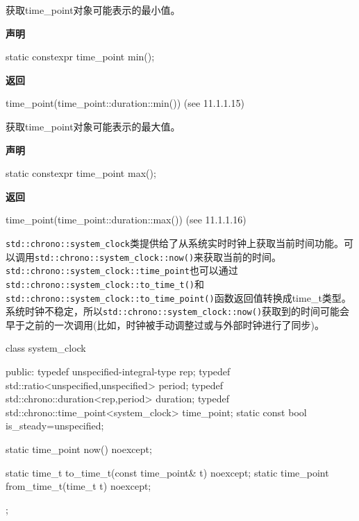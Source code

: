 获取time\_point对象可能表示的最小值。

\textbf{声明}

\begin{cpp}
static constexpr time_point min();
\end{cpp}

\textbf{返回}

\begin{cpp}
time_point(time_point::duration::min()) (see 11.1.1.15)
\end{cpp}


获取time\_point对象可能表示的最大值。

\textbf{声明}

\begin{cpp}
static constexpr time_point max();
\end{cpp}

\textbf{返回}

\begin{cpp}
time_point(time_point::duration::max()) (see 11.1.1.16)
\end{cpp}


\texttt{std::chrono::system\_clock}类提供给了从系统实时时钟上获取当前时间功能。可以调用\texttt{std::chrono::system\_clock::now()}来获取当前的时间。\texttt{std::chrono::system\_clock::time\_point}也可以通过\texttt{std::chrono::system\_clock::to\_time\_t()}和\texttt{std::chrono::system\_clock::to\_time\_point()}函数返回值转换成time\_t类型。系统时钟不稳定，所以\texttt{std::chrono::system\_clock::now()}获取到的时间可能会早于之前的一次调用(比如，时钟被手动调整过或与外部时钟进行了同步)。


\begin{cpp}
class system_clock
{
public:
  typedef unspecified-integral-type rep;
  typedef std::ratio<unspecified,unspecified> period;
  typedef std::chrono::duration<rep,period> duration;
  typedef std::chrono::time_point<system_clock> time_point;
  static const bool is_steady=unspecified;

  static time_point now() noexcept;

  static time_t to_time_t(const time_point& t) noexcept;
  static time_point from_time_t(time_t t) noexcept;
};
\end{cpp}


